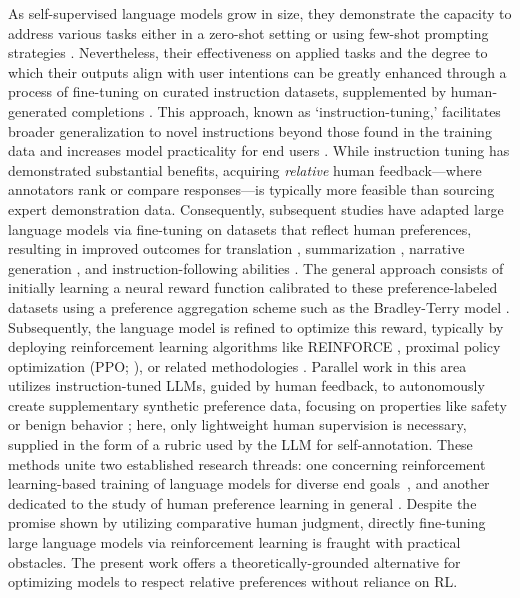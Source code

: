 As self-supervised language models grow in size, they demonstrate the capacity to address various tasks either in a zero-shot setting \citep{radford2019language} or using few-shot prompting strategies \citep{gpt3,megatron,chowdhery2022palm}. Nevertheless, their effectiveness on applied tasks and the degree to which their outputs align with user intentions can be greatly enhanced through a process of fine-tuning on curated instruction datasets, supplemented by human-generated completions \citep{mishra-etal-2022-cross,sanh2022multitask,chung2022scaling,thoppilan2022lamda}. This approach, known as `instruction-tuning,' facilitates broader generalization to novel instructions beyond those found in the training data and increases model practicality for end users \citep{chung2022scaling}. While instruction tuning has demonstrated substantial benefits, acquiring \textit{relative} human feedback—where annotators rank or compare responses—is typically more feasible than sourcing expert demonstration data. Consequently, subsequent studies have adapted large language models via fine-tuning on datasets that reflect human preferences, resulting in improved outcomes for translation \citep{kreutzer-etal-2018-reliability}, summarization \citep{stiennon2022learning,ziegler2020finetuning}, narrative generation \citep{ziegler2020finetuning}, and instruction-following abilities \citep{ouyang2022training,ramamurthy2023is}. The general approach consists of initially learning a neural reward function calibrated to these preference-labeled datasets using a preference aggregation scheme such as the Bradley-Terry model \citep{bradley1952rankanalysis}. Subsequently, the language model is refined to optimize this reward, typically by deploying reinforcement learning algorithms like REINFORCE \citep{williams1992reinforce}, proximal policy optimization (PPO; \cite{schulman2017proximal}), or related methodologies \citep{ramamurthy2023is}. Parallel work in this area utilizes instruction-tuned LLMs, guided by human feedback, to autonomously create supplementary synthetic preference data, focusing on properties like safety or benign behavior \citep{bai2022constitutional}; here, only lightweight human supervision is necessary, supplied in the form of a rubric used by the LLM for self-annotation. These methods unite two established research threads: one concerning reinforcement learning-based training of language models for diverse end goals~\citep{Ranzato2015SequenceLT,paulus2018a,wu2018learning}, and another dedicated to the study of human preference learning in general \citep{christiano2017deep,kupcsik2018learning}. Despite the promise shown by utilizing comparative human judgment, directly fine-tuning large language models via reinforcement learning is fraught with practical obstacles. The present work offers a theoretically-grounded alternative for optimizing models to respect relative preferences without reliance on RL.

